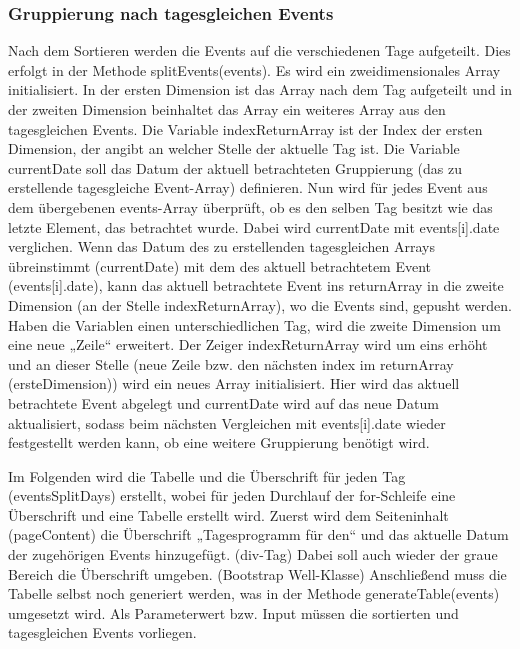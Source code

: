 {\subsubsection{Gruppierung nach tagesgleichen Events}
Nach dem Sortieren werden die Events auf die verschiedenen Tage aufgeteilt. Dies erfolgt in der Methode splitEvents(events). Es wird ein zweidimensionales Array initialisiert. In der ersten Dimension ist das Array nach dem Tag aufgeteilt und in der zweiten Dimension beinhaltet das Array ein weiteres Array aus den tagesgleichen Events. Die Variable indexReturnArray ist der Index der ersten Dimension, der angibt an welcher Stelle der aktuelle Tag ist. Die Variable currentDate soll das Datum der aktuell betrachteten Gruppierung (das zu erstellende tagesgleiche Event-Array) definieren. 
Nun wird für jedes Event aus dem übergebenen events-Array überprüft, ob es den selben Tag besitzt wie das letzte Element, das betrachtet wurde. Dabei wird currentDate mit events[i].date verglichen. 
Wenn das Datum des zu erstellenden tagesgleichen Arrays übreinstimmt (currentDate) mit dem des aktuell betrachtetem Event (events[i].date), kann das aktuell betrachtete Event ins returnArray in die zweite Dimension (an der Stelle indexReturnArray), wo die Events sind, gepusht werden.
Haben die Variablen einen unterschiedlichen Tag, wird die zweite Dimension um eine neue „Zeile“ erweitert. Der Zeiger indexReturnArray wird um eins erhöht und an dieser Stelle (neue Zeile bzw. den nächsten index im returnArray (ersteDimension)) wird ein neues Array initialisiert. Hier wird das aktuell betrachtete Event abgelegt und currentDate wird auf das neue Datum aktualisiert, sodass beim nächsten Vergleichen mit events[i].date wieder festgestellt werden kann, ob eine weitere Gruppierung benötigt wird.

Im Folgenden wird die Tabelle und die Überschrift für jeden Tag (eventsSplitDays) erstellt, wobei für jeden Durchlauf der for-Schleife eine Überschrift und eine Tabelle erstellt wird. Zuerst wird dem Seiteninhalt (pageContent) die Überschrift „Tagesprogramm für den“ und das aktuelle Datum der zugehörigen Events hinzugefügt. (div-Tag) Dabei soll auch wieder der graue Bereich die Überschrift umgeben. (Bootstrap Well-Klasse) 
Anschließend muss die Tabelle selbst noch generiert werden, was in der Methode generateTable(events) umgesetzt wird. Als Parameterwert bzw. Input müssen die sortierten und tagesgleichen Events vorliegen. 

}
